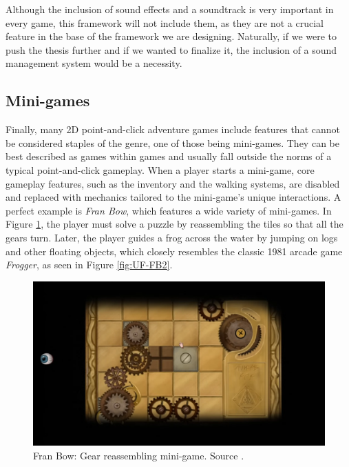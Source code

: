 \begin{notImplemented}
 \par
\vspace{3mm}
Although the inclusion of sound effects and a soundtrack is very important in every game, this framework will not include them, as they are not a crucial feature in the base of the framework we are designing. Naturally, if we were to push the thesis further and if we wanted to finalize it, the inclusion of a sound management system would be a necessity.
\end{notImplemented}

\subsection{Mini-games}
\label{sec:Minigames}
Finally, many 2D point-and-click adventure games include features that cannot be considered staples of the genre, one of those being mini-games. They can be best described as games within games and usually fall outside the norms of a typical point-and-click gameplay. When a player starts a mini-game, core gameplay features, such as the inventory and the walking systems, are disabled and replaced with mechanics tailored to the mini-game’s unique interactions.  A perfect example is \textit{Fran Bow}, which features a wide variety of mini-games. In Figure \ref{fig:UF-FB1}, the player must solve a puzzle by reassembling the tiles so that all the gears turn. Later, the player guides a frog across the water by jumping on logs and other floating objects, which closely resembles the classic 1981 arcade game \textit{Frogger}, as seen in Figure \ref{fig:UF-FB2}. 

\begin{figure}[H]
\centering
\includegraphics[width=.8\linewidth]{img/FB_BF1.png}
\caption{Fran Bow: Gear reassembling mini-game. Source \cite{FranBow}.}
\label{fig:UF-FB1}
\end{figure}

